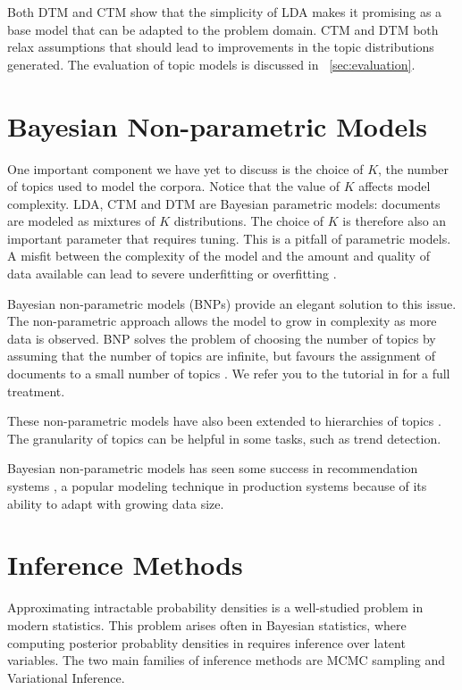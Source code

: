 \documentclass[letterpaper]{article}
\begin{document}
Both DTM and CTM show that the simplicity of LDA makes it promising as
a base model that can be adapted to the problem domain. CTM and DTM both
relax assumptions that should lead to improvements in the topic
distributions generated. The evaluation of topic models is discussed
in ~\autoref{sec:evaluation}.

\section{Bayesian Non-parametric Models}
One important component we have yet to discuss is the choice of $K$,
the number of topics used to model the corpora. Notice that the value
of $K$ affects model complexity. LDA, CTM and DTM are Bayesian
parametric models: documents are modeled as mixtures of $K$
distributions. The choice of $K$ is therefore also an important
parameter that requires tuning. This is a pitfall of parametric
models. A misfit between the complexity of the model and the amount
and quality of data available can lead to severe underfitting or
overfitting \cite{teh2011dirichlet}.

Bayesian non-parametric models (BNPs) provide an elegant solution to this
issue. The non-parametric approach allows the model to grow in
complexity as more data is observed. BNP solves the problem of
choosing the number of topics by assuming that the number of topics
are infinite, but favours the assignment of documents to a small
number of topics \cite{gershman2012tutorial}. We refer you to the
tutorial in \cite{gershman2012tutorial} for a full treatment.

These non-parametric models have also been extended to hierarchies of
topics \cite{blei2010nested}. The granularity of topics can be helpful
in some tasks, such as trend detection.

Bayesian non-parametric models has seen some success in recommendation
systems \cite{gopalan2014bayesian}, a popular modeling technique in
production systems because of its ability to adapt with growing data
size.

\section{Inference Methods}
\label{sec:inference}
Approximating intractable probability densities is a well-studied
problem in modern statistics. This problem arises often in Bayesian
statistics, where computing posterior probablity densities in requires
inference over latent variables. The two main families of inference
methods are MCMC sampling and Variational Inference.
\end{document}
